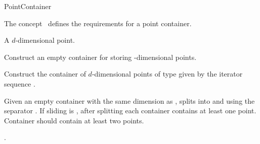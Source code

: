 

\begin{ccRefConcept}{PointContainer}


\begin{ccAdvanced}

\ccDefinition
  
The concept \ccRefName\ defines the requirements for
a point container. 


\ccTypes

 { A $d$-dimensional point.}
\ccCreation
{}  %

{
Construct an empty container for storing -dimensional points.
}

{
Construct the container of $d$-dimensional points of type 
given by the iterator sequence \ccc{[begin,end)}.
}

\ccOperations

{Given an empty container  with the same dimension as , splits  into
 and  using the separator . If sliding is , after splitting 
each container contains at least one point. Container  should contain at least two points.}

\ccHasModels

.

\ccSeeAlso

\\
\\

\end{ccAdvanced}
\end{ccRefConcept}


